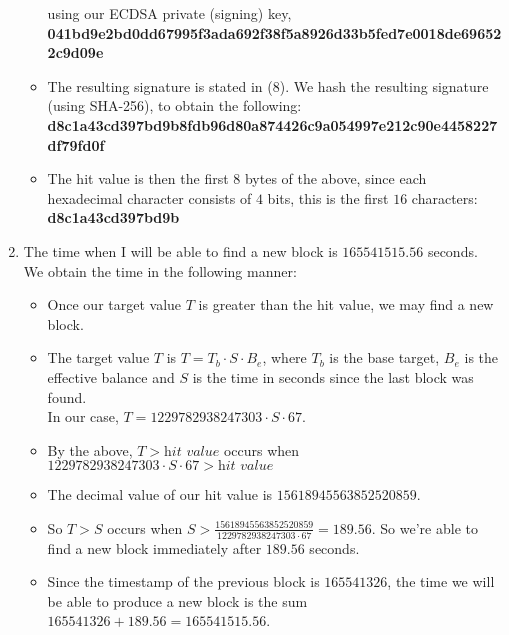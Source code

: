 \documentclass[12pt, a4paper]{article}
\begin{document}
\begin{enumerate}
\begin{itemize}
using our ECDSA private (signing) key,\\ \phantom{abc} \textbf{041bd9e2bd0dd67995f3ada692f38f5a8926d33b5fed7e0018de696522c9d09e}
\item The resulting signature is stated in (8). We hash the resulting signature (using SHA-256), to obtain the following:\\ \phantom{abc} \textbf{d8c1a43cd397bd9b8fdb96d80a874426c9a054997e212c90e4458227df79fd0f}
\item The hit value is then the first $8$ bytes of the above, since each hexadecimal character consists of $4$ bits, this is the first $16$ characters:\\ \phantom{abc} \textbf{d8c1a43cd397bd9b}
\end{itemize}
\item The time when I will be able to find a new block is $165541515.56$ seconds.\\
\phantom{a} We obtain the time in the following manner: 
\begin{itemize}
\renewcommand\labelitemi{\tiny$\bullet$}
\itemsep0em
\item Once our target value $T$ is greater than the hit value, we may find a new block.
\item The target value $T$ is  $T = T_b \cdot S \cdot B_e $, where $T_b$ is the base target, $B_e$ is the effective balance and $S$ is the time in seconds since the last block was found.\\
In our case, $T = 1229782938247303 \cdot S \cdot 67 $.
\item By the above, $T > \textit{hit value}$ occurs when  $1229782938247303 \cdot S \cdot 67 > \textit{hit value}$
\item The decimal value of our hit value is $15618945563852520859$.
\item So $T>S$ occurs when $S > \frac{\textit{15618945563852520859}}{1229782938247303 \cdot 67} = 189.56$. So we're able to find a new block immediately after $189.56$ seconds.
\item Since the timestamp of the previous block is $165541326$, the time we will be able to produce a new block is the sum $165541326 + 189.56 =  165541515.56$.
\end{itemize}
\end{enumerate}
\end{document}
